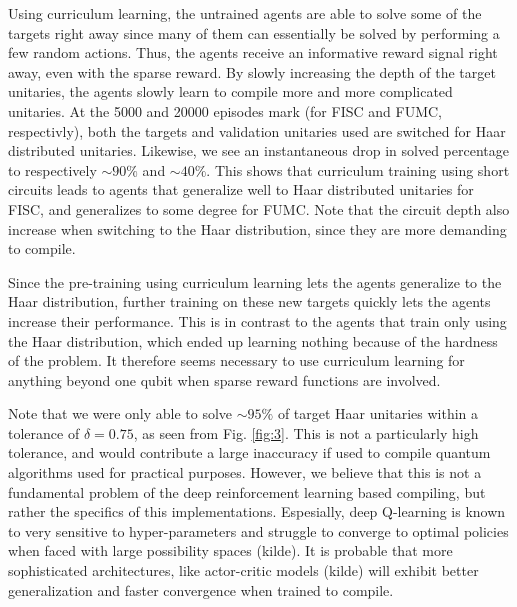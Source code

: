 \documentclass[%
 aip,
 floatfix,
 amsmath,amssymb,
 reprint,%
]{revtex4-1}
\begin{document}
Using curriculum learning, the untrained agents are able to solve some of the targets right away since many of them can essentially be solved by performing a few random actions. Thus, the agents receive an informative reward signal right away, even with the sparse reward. By slowly increasing the depth of the target unitaries, the agents slowly learn to compile more and more complicated unitaries. At the 5000 and 20000 episodes mark (for FISC and FUMC, respectivly), both the targets and validation unitaries used are switched for Haar distributed unitaries. Likewise, we see an instantaneous drop in solved percentage to respectively $\sim 90\%$ and $\sim 40 \%$. This shows that curriculum training using short circuits leads to agents that generalize well to Haar distributed unitaries for FISC, and generalizes to some degree for FUMC. Note that the circuit depth also increase when switching to the Haar distribution, since they are more demanding to compile.

Since the pre-training using curriculum learning lets the agents generalize to the Haar distribution, further training on these new targets quickly lets the agents increase their performance. This is in contrast to the agents that train only using the Haar distribution, which ended up learning nothing because of the hardness of the problem. It therefore seems necessary to use curriculum learning for anything beyond one qubit when sparse reward functions are involved. 


Note that we were only able to solve $\sim 95\%$ of target Haar unitaries within a tolerance of $\delta = 0.75$, as seen from Fig. \ref{fig:3}. This is not a particularly high tolerance, and would contribute a large inaccuracy if used to compile quantum algorithms used for practical purposes. However, we believe that this is not a fundamental problem of the deep reinforcement learning based compiling, but rather the specifics of this implementations. Espesially, deep Q-learning is known to very sensitive to hyper-parameters and struggle to converge to optimal policies when faced with large possibility spaces (kilde). It is probable that more sophisticated architectures, like actor-critic models (kilde) will exhibit better generalization and faster convergence when trained to compile.

\end{document}
